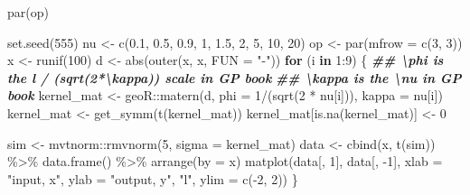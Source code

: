 \documentclass[
]{article}
\newenvironment{Shaded}{\begin{snugshade}}{\end{snugshade}}
\newcommand{\AttributeTok}[1]{\textcolor[rgb]{0.77,0.63,0.00}{#1}}
\newcommand{\ControlFlowTok}[1]{\textcolor[rgb]{0.13,0.29,0.53}{\textbf{#1}}}
\newcommand{\DecValTok}[1]{\textcolor[rgb]{0.00,0.00,0.81}{#1}}
\newcommand{\DocumentationTok}[1]{\textcolor[rgb]{0.56,0.35,0.01}{\textbf{\textit{#1}}}}
\newcommand{\FloatTok}[1]{\textcolor[rgb]{0.00,0.00,0.81}{#1}}
\newcommand{\FunctionTok}[1]{\textcolor[rgb]{0.00,0.00,0.00}{#1}}
\newcommand{\NormalTok}[1]{#1}
\newcommand{\OtherTok}[1]{\textcolor[rgb]{0.56,0.35,0.01}{#1}}
\newcommand{\SpecialCharTok}[1]{\textcolor[rgb]{0.00,0.00,0.00}{#1}}
\newcommand{\StringTok}[1]{\textcolor[rgb]{0.31,0.60,0.02}{#1}}
\begin{document}
\begin{Shaded}
\begin{Highlighting}[]
\FunctionTok{par}\NormalTok{(op)}
\end{Highlighting}
\end{Shaded}

\begin{Shaded}
\begin{Highlighting}[]
\FunctionTok{set.seed}\NormalTok{(}\DecValTok{555}\NormalTok{)}
\NormalTok{nu }\OtherTok{\textless{}{-}} \FunctionTok{c}\NormalTok{(}\FloatTok{0.1}\NormalTok{, }\FloatTok{0.5}\NormalTok{, }\FloatTok{0.9}\NormalTok{, }\DecValTok{1}\NormalTok{, }
        \FloatTok{1.5}\NormalTok{, }\DecValTok{2}\NormalTok{, }\DecValTok{5}\NormalTok{, }\DecValTok{10}\NormalTok{, }\DecValTok{20}\NormalTok{)}
\NormalTok{op }\OtherTok{\textless{}{-}} \FunctionTok{par}\NormalTok{(}\AttributeTok{mfrow =} \FunctionTok{c}\NormalTok{(}\DecValTok{3}\NormalTok{, }\DecValTok{3}\NormalTok{))}
\NormalTok{x }\OtherTok{\textless{}{-}} \FunctionTok{runif}\NormalTok{(}\DecValTok{100}\NormalTok{)}
\NormalTok{d }\OtherTok{\textless{}{-}} \FunctionTok{abs}\NormalTok{(}\FunctionTok{outer}\NormalTok{(x, x, }\AttributeTok{FUN =} \StringTok{"{-}"}\NormalTok{))}
\ControlFlowTok{for}\NormalTok{ (i }\ControlFlowTok{in} \DecValTok{1}\SpecialCharTok{:}\DecValTok{9}\NormalTok{) \{}
  \DocumentationTok{\#\# \textbackslash{}phi is the l / (sqrt(2*\textbackslash{}kappa))  scale in GP book}
  \DocumentationTok{\#\# \textbackslash{}kappa is the \textbackslash{}nu in GP book}
\NormalTok{  kernel\_mat }\OtherTok{\textless{}{-}}\NormalTok{ geoR}\SpecialCharTok{::}\FunctionTok{matern}\NormalTok{(d, }\AttributeTok{phi =} \DecValTok{1}\SpecialCharTok{/}\NormalTok{(}\FunctionTok{sqrt}\NormalTok{(}\DecValTok{2} \SpecialCharTok{*}\NormalTok{ nu[i])), }\AttributeTok{kappa =}\NormalTok{ nu[i]) }
\NormalTok{  kernel\_mat }\OtherTok{\textless{}{-}} \FunctionTok{get\_symm}\NormalTok{(}\FunctionTok{t}\NormalTok{(kernel\_mat))}
\NormalTok{  kernel\_mat[}\FunctionTok{is.na}\NormalTok{(kernel\_mat)] }\OtherTok{\textless{}{-}} \DecValTok{0} 
  
\NormalTok{  sim }\OtherTok{\textless{}{-}}\NormalTok{ mvtnorm}\SpecialCharTok{::}\FunctionTok{rmvnorm}\NormalTok{(}\DecValTok{5}\NormalTok{, }\AttributeTok{sigma =}\NormalTok{ kernel\_mat)}
\NormalTok{  data }\OtherTok{\textless{}{-}} \FunctionTok{cbind}\NormalTok{(x, }\FunctionTok{t}\NormalTok{(sim)) }\SpecialCharTok{\%\textgreater{}\%} 
    \FunctionTok{data.frame}\NormalTok{() }\SpecialCharTok{\%\textgreater{}\%}
    \FunctionTok{arrange}\NormalTok{(}\AttributeTok{by =}\NormalTok{ x)}
  \FunctionTok{matplot}\NormalTok{(data[, }\DecValTok{1}\NormalTok{], data[, }\SpecialCharTok{{-}}\DecValTok{1}\NormalTok{], }
          \AttributeTok{xlab =} \StringTok{"input, x"}\NormalTok{, }\AttributeTok{ylab =} \StringTok{"output, y"}\NormalTok{,}
          \StringTok{"l"}\NormalTok{, }\AttributeTok{ylim =} \FunctionTok{c}\NormalTok{(}\SpecialCharTok{{-}}\DecValTok{2}\NormalTok{, }\DecValTok{2}\NormalTok{))}
\NormalTok{\}}
\end{Highlighting}
\end{Shaded}
\end{document}
